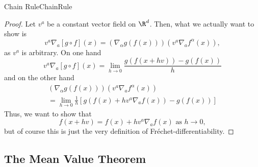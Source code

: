 \begin{prp}{Chain Rule}{ChainRule}
\begin{proof}
Let $v^a$ be a constant vector field on $\R ^d$.  Then, what we actually want to show is
\begin{equation}
v^a\nabla _a[g\circ f](x)=\left( \nabla _\alpha g(f(x))\right) \left( v^a\nabla _af^\alpha (x)\right) ,
\end{equation}
as $v^a$ is arbitrary.  On one hand
\begin{equation}\label{5.2.18}
v^a\nabla _a[g\circ f](x)=\lim _{h\to 0}\frac{g\left( f(x+hv)\right) -g(f(x))}{h}
\end{equation}
and on the other hand
\begin{equation}
\begin{multlined}
\left( \nabla _\alpha g(f(x))\right) \left( v^a\nabla _af^\alpha (x)\right) \\ =\lim _{h\to 0}\frac{1}{h}\left[ g\left( f(x)+hv^a\nabla _af(x)\right) -g(f(x))\right]
\end{multlined}
\end{equation}
Thus, we want to show that
\begin{equation}
f(x+hv)=f(x)+hv^a\nabla _af(x)\text{ as }h\to 0,
\end{equation}
but of course this is just the very definition of Fréchet-differentiability.
\end{proof}
\end{prp}

\subsection{The Mean Value Theorem}

